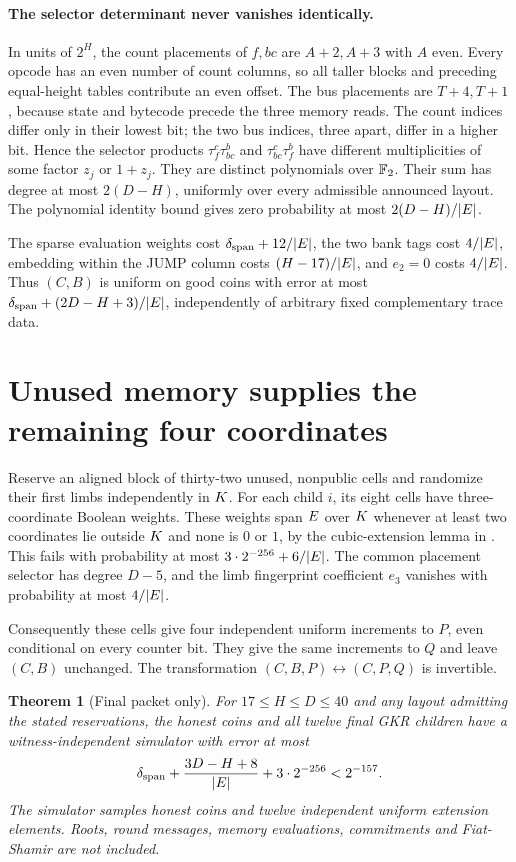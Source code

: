 \documentclass[11pt]{article}
\newtheorem{theorem}{Theorem}
\begin{document}
\paragraph{The selector determinant never vanishes identically.} In units of $2^H$, the count placements of $f,bc$ are $A+2,A+3$ with $A$ even. Every opcode has an even number of count columns, so all taller blocks and preceding equal-height tables contribute an even offset. The bus placements are $T+4,T+1$, because state and bytecode precede the three memory reads. The count indices differ only in their lowest bit; the two bus indices, three apart, differ in a higher bit. Hence the selector products $\tau^c_f\tau^b_{bc}$ and $\tau^c_{bc}\tau^b_f$ have different multiplicities of some factor $z_j$ or $1+z_j$. They are distinct polynomials over $\mathbb{F}_2$. Their sum has degree at most $2(D-H)$, uniformly over every admissible announced layout. The polynomial identity bound gives zero probability at most $2(D-H)/|E|$.

The sparse evaluation weights cost $\delta_{\mathrm{span}}+12/|E|$, the two bank tags cost $4/|E|$, embedding within the JUMP column costs $(H-17)/|E|$, and $e_2=0$ costs $4/|E|$. Thus $(C,B)$ is uniform on good coins with error at most $\delta_{\mathrm{span}}+(2D-H+3)/|E|$, independently of arbitrary fixed complementary trace data.

\section{Unused memory supplies the remaining four coordinates}

Reserve an aligned block of thirty-two unused, nonpublic cells and randomize their first limbs independently in $K$. For each child $i$, its eight cells have three-coordinate Boolean weights. These weights span $E$ over $K$ whenever at least two coordinates lie outside $K$ and none is $0$ or $1$, by the cubic-extension lemma in . This fails with probability at most $3\cdot2^{-256}+6/|E|$. The common placement selector has degree $D-5$, and the limb fingerprint coefficient $e_3$ vanishes with probability at most $4/|E|$.

Consequently these cells give four independent uniform increments to $P$, even conditional on every counter bit. They give the same increments to $Q$ and leave $(C,B)$ unchanged. The transformation $(C,B,P)\leftrightarrow(C,P,Q)$ is invertible.

\begin{theorem}[Final packet only]
For $17\le H\le D\le40$ and any layout admitting the stated reservations, the honest coins and all twelve final GKR children have a witness-independent simulator with error at most
\[
 \delta_{\mathrm{span}}+\frac{3D-H+8}{|E|}+3\cdot2^{-256}<2^{-157}.
\]
The simulator samples honest coins and twelve independent uniform extension elements. Roots, round messages, memory evaluations, commitments and Fiat-Shamir are not included.
\end{theorem}
\end{document}
